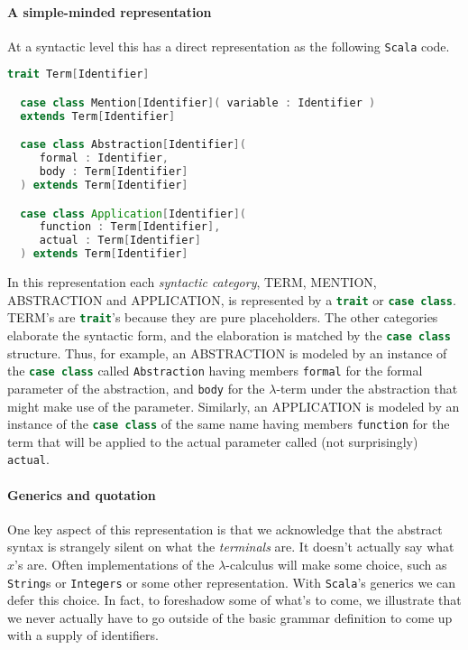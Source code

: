 \paragraph{A simple-minded representation}
At a syntactic level this has a direct representation as the following
\texttt{Scala} code.

\begin{lstlisting}[language=Scala]
  trait Term[Identifier]

  case class Mention[Identifier]( variable : Identifier )
  extends Term[Identifier]

  case class Abstraction[Identifier](
     formal : Identifier,
     body : Term[Identifier]
  ) extends Term[Identifier]

  case class Application[Identifier](
     function : Term[Identifier], 
     actual : Term[Identifier]
  ) extends Term[Identifier]
\end{lstlisting}

In this representation each \emph{syntactic category}, TERM, MENTION,
ABSTRACTION and APPLICATION, is represented by a
\lstinline[language=Scala]!trait! or \lstinline[language=Scala]!case class!.
TERM's are \lstinline[language=Scala]!trait!'s because they
are pure placeholders. The other categories elaborate the syntactic
form, and the elaboration is matched by the
\lstinline[language=Scala]!case class!  structure. Thus, for example,
an ABSTRACTION is modeled by an instance of the
\lstinline[language=Scala]!case class! called
\lstinline[language=Scala]!Abstraction! having members
\lstinline[language=Scala]!formal! for the formal parameter of the
abstraction, and \lstinline[language=Scala]!body! for the
$\lambda$-term under the abstraction that might make use of the
parameter. Similarly, an APPLICATION is modeled by an instance of the
\lstinline[language=Scala]!case class! of the same name having members
\lstinline[language=Scala]!function! for the term that will be applied
to the actual parameter called (not surprisingly)
\lstinline[language=Scala]!actual!.

\paragraph{Generics and quotation}
One key aspect of this representation is that we acknowledge that the
abstract syntax is strangely silent on what the \emph{terminals}
are. It doesn't actually say what $x$'s are. Often implementations of
the $\lambda$-calculus will make some choice, such as
\lstinline[language=Scala]!String!s or
\lstinline[language=Scala]!Integers! or some other
representation. With \texttt{Scala}'s generics we can defer this
choice. In fact, to foreshadow some of what's to come, we illustrate
that we never actually have to go outside of the basic grammar
definition to come up with a supply of identifiers.


